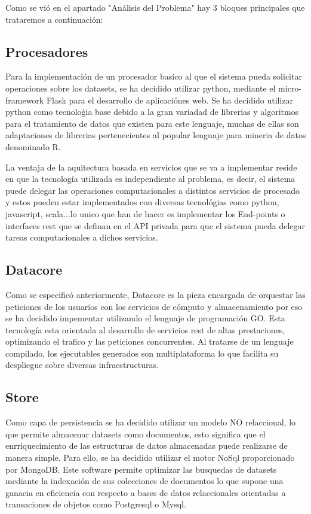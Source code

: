 \documentclass[a4paper,11pt]{book}
\begin{document}
Como se vió en el apartado "Análisis del Problema" hay 3 bloques principales que trataremos a continuación:  

\subsection{Procesadores}

Para la implementación de un procesador basíco al que el sistema pueda solicitar operaciones sobre los datasets, se ha decidido utilizar python, mediante el micro-framework Flask para el desarrollo de aplicaciónes web. Se ha decidido utilizar python como tecnoloǵia base debido a la gran variadad de librerias y algoritmos para el tratamiento de datos que existen para este lenguaje, muchas de ellas son adaptaciones de librerias pertenecientes al popular lenguaje para mineria de datos denominado R. 

La ventaja de la aquitectura basada en servicios que se va a implementar reside en que la tecnología utilizada es independiente al problema, es decir, el sistema puede delegar las operaciones computacionales a distintos servicios de procesado y estos pueden estar implementados con diversas tecnológias como python, javascript, scala...lo unico que han de hacer es implementar los End-points o interfaces rest que se definan en el API privada para que el sistema pueda delegar tareas computacionales a dichos servicios.

\subsection{Datacore}

Como se especificó anteriormente, Datacore es la pieza encargada de orquestar las peticiones de los usuarios con los servicios de cómputo y almacenamiento por eso se ha decidido impementar utilizando el lenguaje de programación GO. Esta tecnología esta orientada al desarrollo de servicios rest de altas prestaciones, optimizando el trafico y las peticiones concurrentes. Al tratarse de un lenguaje compilado, los ejecutables generados son multiplataforma lo que facilita su despliegue sobre diversas infraestructuras. 

\subsection{Store}

Como capa de persistencia se ha decidido utilizar un modelo NO relaccional, lo que permite almacenar datasets como documentos, esto significa que el enrriquecimiento de las estructuras de datos almacenadas puede realizarse de manera simple. Para ello, se ha decidido utilizar el motor NoSql proporcionado por MongoDB. Este software permite optimizar las busquedas de datasets mediante la indexación de sus colecciones de documentos lo que supone una ganacia en eficiencia con respecto a bases de datos relaccionales orientadas a transaciones de objetos como Postgresql o Mysql.   
\end{document}
